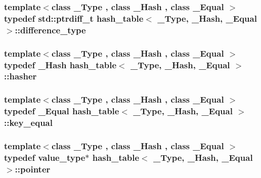 \subsubsection[{difference\+\_\+type}]{\setlength{\rightskip}{0pt plus 5cm}template$<$class \+\_\+\+Type , class \+\_\+\+Hash , class \+\_\+\+Equal $>$ typedef std\+::ptrdiff\+\_\+t {\bf hash\+\_\+table}$<$ \+\_\+\+Type, \+\_\+\+Hash, \+\_\+\+Equal $>$\+::{\bf difference\+\_\+type}}\label{classhash__table_a7f48994c34ddc1f8a19ffa7dc3821b40}
\hypertarget{classhash__table_a50374ab474440525f6739d9e45a851f9}{}
\subsubsection[{hasher}]{\setlength{\rightskip}{0pt plus 5cm}template$<$class \+\_\+\+Type , class \+\_\+\+Hash , class \+\_\+\+Equal $>$ typedef \+\_\+\+Hash {\bf hash\+\_\+table}$<$ \+\_\+\+Type, \+\_\+\+Hash, \+\_\+\+Equal $>$\+::{\bf hasher}}\label{classhash__table_a50374ab474440525f6739d9e45a851f9}
\hypertarget{classhash__table_a0261fc20ffaacd3a8b3f4562dd631beb}{}
\subsubsection[{key\+\_\+equal}]{\setlength{\rightskip}{0pt plus 5cm}template$<$class \+\_\+\+Type , class \+\_\+\+Hash , class \+\_\+\+Equal $>$ typedef \+\_\+\+Equal {\bf hash\+\_\+table}$<$ \+\_\+\+Type, \+\_\+\+Hash, \+\_\+\+Equal $>$\+::{\bf key\+\_\+equal}}\label{classhash__table_a0261fc20ffaacd3a8b3f4562dd631beb}
\hypertarget{classhash__table_ad9e0d75b1e6756dc449ba917383d0dee}{}
\subsubsection[{pointer}]{\setlength{\rightskip}{0pt plus 5cm}template$<$class \+\_\+\+Type , class \+\_\+\+Hash , class \+\_\+\+Equal $>$ typedef {\bf value\+\_\+type}$\ast$ {\bf hash\+\_\+table}$<$ \+\_\+\+Type, \+\_\+\+Hash, \+\_\+\+Equal $>$\+::{\bf pointer}}\label{classhash__table_ad9e0d75b1e6756dc449ba917383d0dee}
\hypertarget{classhash__table_a92ee06d8c071e7a5b41861d2622e02de}{}

